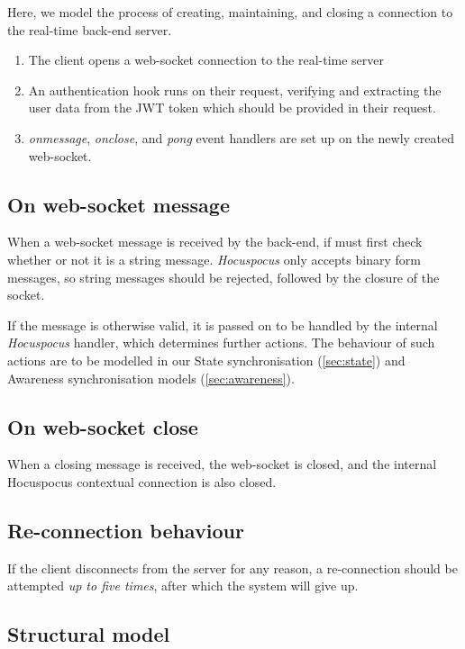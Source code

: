 \documentclass[a4paper, final]{report}
\begin{document}
Here, we model the process of creating, maintaining, and closing a connection to the real-time
back-end server.

\begin{enumerate}
	\item The client opens a web-socket connection to the real-time server
	\item An authentication hook runs on their request, verifying and extracting the user data from
	      the JWT token which should be provided in their request.
	\item \textit{onmessage}, \textit{onclose}, and \textit{pong} event handlers are set up
	      on the newly created web-socket.
\end{enumerate}

\subsection{On web-socket message}

When a web-socket message is received by the back-end, if must first check whether or not it is a string
message. \textit{Hocuspocus} only accepts binary form messages, so string messages should be rejected, followed
by the closure of the socket.

If the message is otherwise valid, it is passed on to be handled by the internal \textit{Hocuspocus} handler,
which determines further actions. The behaviour of such actions are to be modelled in our
State synchronisation (\autoref{sec:state})
and Awareness synchronisation models (\autoref{sec:awareness}).

\subsection{On web-socket close}

When a closing message is received, the web-socket is closed, and the internal Hocuspocus contextual connection
is also closed.

\subsection{Re-connection behaviour}

If the client disconnects from the server for any reason, a re-connection should be attempted
\textit{up to five times}, after which the system will give up.

\subsection{Structural model}
\end{document}
